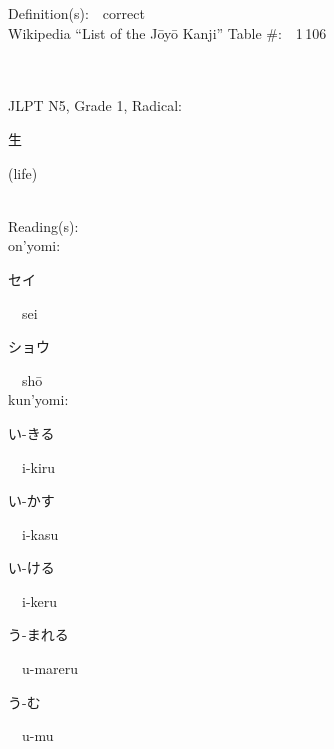 \begin{multicols}{2}
Definition(s):\ \ correct \\
Wikipedia ``List of the J\=oy\=o Kanji'' Table \#:\ \ 1\,106 \\
\ \ \\
{\fontsize{34pt}{40pt}  }\ \ \\  %
{JLPT N5, Grade 1, Radical:\ \ {\begin{CJK}{UTF8}{min} 生 \end{CJK}} (life) } \\
Reading(s):\ \ \\
{\hspace*{1em}}on'yomi:\ \ \\
{\hspace*{2em}}{\begin{CJK}{UTF8}{min} セイ \end{CJK}}\ \ sei\ \ \\
{\hspace*{2em}}{\begin{CJK}{UTF8}{min} ショウ \end{CJK}}\ \ sh\=o\ \ \\
{\hspace*{1em}}kun'yomi:\ \ \\
{\hspace*{2em}}{\begin{CJK}{UTF8}{min} い-きる \end{CJK}}\ \ i-kiru\ \ \\
{\hspace*{2em}}{\begin{CJK}{UTF8}{min} い-かす \end{CJK}}\ \ i-kasu\ \ \\
{\hspace*{2em}}{\begin{CJK}{UTF8}{min} い-ける \end{CJK}}\ \ i-keru\ \ \\
{\hspace*{2em}}{\begin{CJK}{UTF8}{min} う-まれる \end{CJK}}\ \ u-mareru\ \ \\
{\hspace*{2em}}{\begin{CJK}{UTF8}{min} う-む \end{CJK}}\ \ u-mu\ \ \\

\end{multicols}
